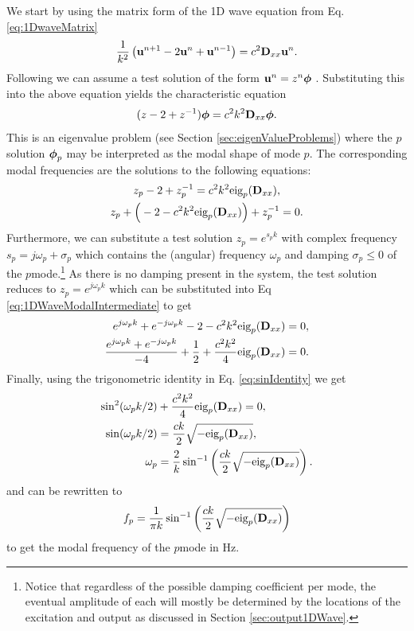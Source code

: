 {{We start by using the matrix form of the 1D wave equation from Eq. \eqref{eq:1DwaveMatrix}
\begin{equation*}
    \frac{1}{k^2}\left(\mathbf{u}^{n+1}-2\mathbf{u}^n+\mathbf{u}^{n-1}\right) = c^2 \mathbf{D}_{xx}\mathbf{u}^n.
\end{equation*}
Following \cite{theBible} we can assume a test solution of the form $\mathbf{u}^n = z^n\boldsymbol{\phi}$ . Substituting this into the above equation yields the characteristic equation
\begin{equation}
    (z - 2 + z^{-1})\boldsymbol{\phi} = c^2k^2\mathbf{D}_{xx} \boldsymbol{\phi}.
\end{equation}
This is an eigenvalue problem (see Section \ref{sec:eigenValueProblems}) where the $p$\th solution $\boldsymbol{\phi}_p$ may be interpreted as the modal shape of mode $p$. The corresponding modal frequencies are the solutions to the following equations:
\begin{gather}\label{eq:1DWaveModalIntermediate}
    z_p-2+z_p^{-1} = c^2k^2\text{eig}_p(\mathbf{D}_{xx}),\nonumber\\
    z_p+\Big(-2-c^2k^2\text{eig}_p(\mathbf{D}_{xx})\Big)+z_p^{-1}=0.
\end{gather}
Furthermore, we can substitute a test solution $z_p = e^{s_pk}$ with complex frequency $s_p = j\omega_p + \sigma_p$ which contains the (angular) frequency $\omega_p$ and damping $\sigma_p \leq 0$  of the $p$\th mode.\footnote{Notice that regardless of the possible damping coefficient per mode, the eventual amplitude of each will mostly be determined by the locations of the excitation and output as discussed in Section \ref{sec:output1DWave}.} As there is no damping present in the system, the test solution reduces to $z_p = e^{j\omega_p k}$ which can be substituted into Eq \eqref{eq:1DWaveModalIntermediate} to get
\begin{align*}
    e^{j\omega_pk}+e^{-j\omega_pk}-2-c^2k^2\text{eig}_p(\mathbf{D}_{xx})&=0,\\
    \frac{e^{j\omega_pk}+e^{-j\omega_pk}}{-4}+\frac{1}{2}+\frac{c^2k^2}{4}\text{eig}_p(\mathbf{D}_{xx})&=0.
\end{align*}
Finally, using the trigonometric identity in Eq. \eqref{eq:sinIdentity} we get
\begin{align}
    \sin^2(\omega_pk/2)&+\frac{c^2k^2}{4}\text{eig}_p(\mathbf{D}_{xx})=0,\nonumber\\
    \sin(\omega_pk/2)&=\frac{ck}{2}\sqrt{-\text{eig}_p(\mathbf{D}_{xx})},\nonumber\\
    \omega_p &= \frac{2}{k}\sin^{-1}\left(\frac{ck}{2}\sqrt{-\text{eig}_p(\mathbf{D}_{xx})}\right).\label{eq:1DWaveModesAngular}
\end{align}
and can be rewritten to 
\begin{equation}
    f_p = \frac{1}{\pi k}\sin^{-1}\left(\frac{ck}{2}\sqrt{-\text{eig}_p(\mathbf{D}_{xx})}\right)\label{eq:1DWaveModes}
\end{equation}
to get the modal frequency of the $p$\th mode in Hz.

}}
